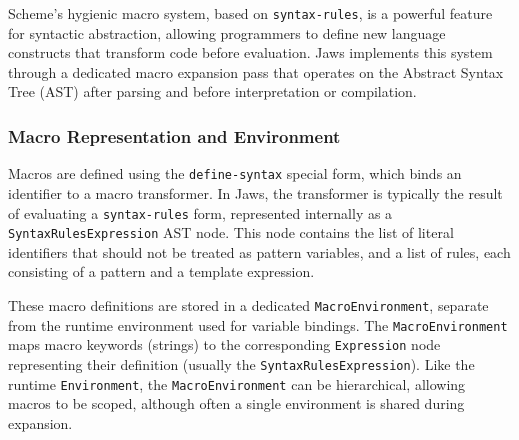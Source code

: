 \documentclass[final]{cmpreport_02}
\begin{document}
Scheme's hygienic macro system, based on \texttt{syntax-rules}, is a powerful feature for syntactic abstraction, allowing programmers to define new language constructs that transform code before evaluation. Jaws implements this system through a dedicated macro expansion pass that operates on the Abstract Syntax Tree (AST) after parsing and before interpretation or compilation.

\subsubsection{Macro Representation and Environment}
Macros are defined using the \texttt{define-syntax} special form, which binds an identifier to a macro transformer. In Jaws, the transformer is typically the result of evaluating a \texttt{syntax-rules} form, represented internally as a \texttt{SyntaxRulesExpression} AST node. This node contains the list of literal identifiers that should not be treated as pattern variables, and a list of rules, each consisting of a pattern and a template expression.

These macro definitions are stored in a dedicated \texttt{MacroEnvironment}, separate from the runtime environment used for variable bindings. The \texttt{MacroEnvironment} maps macro keywords (strings) to the corresponding \texttt{Expression} node representing their definition (usually the \texttt{SyntaxRulesExpression}). Like the runtime \texttt{Environment}, the \texttt{MacroEnvironment} can be hierarchical, allowing macros to be scoped, although often a single environment is shared during expansion.
\end{document}
